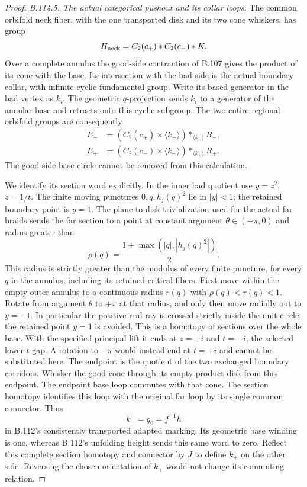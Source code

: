 \begin{proof}
\emph{B.114.5. The actual categorical pushout and its collar loops.}
The common orbifold neck fiber, with the one transported disk
and its two cone whiskers, has group
\[
 H_{\rm neck}=C_2(c_+)*C_2(c_-)*K.
\]
Over a complete annulus the good-side contraction of B.107 gives
the product of its cone with the base. Its intersection with the
bad side is the actual boundary collar, with infinite cyclic
fundamental group. Write its based generator in the bad vertex
as $k_i$. The geometric $q$-projection sends $k_i$ to a generator
of the annular base and retracts onto this cyclic subgroup. The
two entire regional orbifold groups are consequently
\begin{equation}\label{eq:B114-regional}
 \begin{aligned}
 E_-&=(C_2(c_+)\times\langle k_-\rangle)
                      *_{\langle k_-\rangle} R_-,\\
 E_+&=(C_2(c_-)\times\langle k_+\rangle)
                      *_{\langle k_+\rangle} R_+.
 \end{aligned}
\end{equation}
The good-side base circle cannot be removed from this calculation.

We identify its section word explicitly. In the inner bad quotient
use $y=z^2$, $z=1/t$. The finite moving punctures
$0,q,h_j(q)^2$ lie in $|y|<1$; the retained boundary point is
$y=1$. The plane-to-disk trivialization used for the actual far
braids sends the far section to a point at constant argument
$\theta\in(-\pi,0)$ and radius greater than
\[
 \rho(q)=\frac{1+\max(|q|,|h_j(q)^2|)}2.
\]
This radius is strictly greater than the modulus of every finite
puncture, for every $q$ in the annulus, including its retained
critical fibers. First move within the empty outer annulus to a
continuous radius $r(q)$ with $\rho(q)<r(q)<1$. Rotate from
argument $\theta$ to $+\pi$ at that radius, and only then move
radially out to $y=-1$. In particular the positive real ray is
crossed strictly inside the unit circle; the retained point
$y=1$ is avoided. This is a homotopy of sections over the whole
base. With the specified principal lift it ends at $z=+i$ and
$t=-i$, the selected lower-$t$ gap. A rotation to $-\pi$ would
instead end at $t=+i$ and cannot be substituted here.
The endpoint is the quotient of the two exchanged boundary
corridors. Whisker the good cone through its empty product disk
from this endpoint. The endpoint base loop commutes with that
cone. The section homotopy identifies this loop with the original
far loop by its single common connector. Thus
\[
 k_-=g_0=f^{-1}h
\]
in B.112's consistently transported adapted marking. Its geometric
base winding is one, whereas B.112's unfolding height sends this
same word to zero. Reflect this complete section homotopy and
connector by $J$ to define $k_+$ on the other side. Reversing the
chosen orientation of $k_+$ would not change its commuting relation.


\end{proof}
